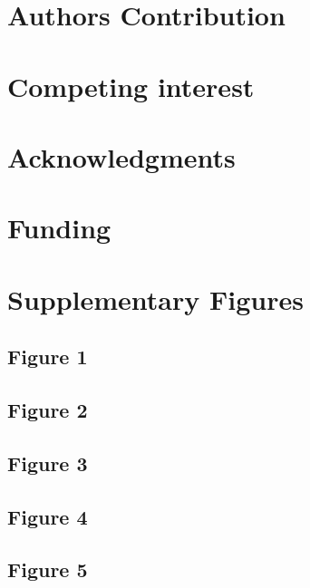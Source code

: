 \documentclass[12pt,twoside]{reedthesis}
\begin{document}
\hypertarget{authors-contribution}{%
\section{Authors Contribution}\label{authors-contribution}}

\hypertarget{competing-interest}{%
\section{Competing interest}\label{competing-interest}}

\newpage

\hypertarget{acknowledgments}{%
\section{Acknowledgments}\label{acknowledgments}}

\hypertarget{funding}{%
\section{Funding}\label{funding}}

\newpage

\hypertarget{supplementary-figures}{%
\section{Supplementary Figures}\label{supplementary-figures}}

\hypertarget{figure-1}{%
\subsection{Figure 1}\label{figure-1}}

\hypertarget{figure-2}{%
\subsection{Figure 2}\label{figure-2}}

\hypertarget{figure-3}{%
\subsection{Figure 3}\label{figure-3}}

\hypertarget{figure-4}{%
\subsection{Figure 4}\label{figure-4}}

\hypertarget{figure-5}{%
\subsection{Figure 5}\label{figure-5}}
\end{document}
